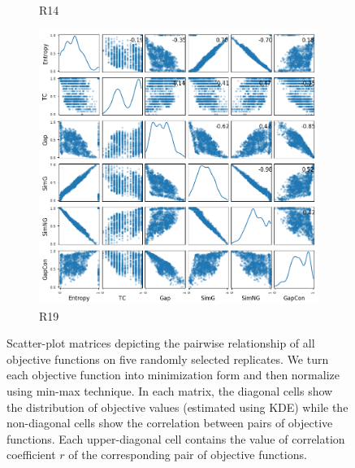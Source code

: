 \begin{figure}[!htbp]
\begin{adjustwidth}{-1cm}{-1cm}
\begin{subfigure}{0.35\textwidth}
			\caption{R14}
		\end{subfigure}
		\begin{subfigure}{0.35\textwidth}
			\includegraphics[width=\columnwidth]{Figure/6-obj-old/R19/fig/scatter_mattrix}
			\caption{R19}
		\end{subfigure}
		\caption{Scatter-plot matrices depicting the pairwise relationship of all objective functions on five randomly selected replicates. We turn each objective function into minimization form and then normalize using min-max technique. In each matrix, the diagonal cells show the distribution of objective values (estimated using KDE) while the non-diagonal cells show the correlation between pairs of objective functions. Each upper-diagonal cell contains the value of correlation coefficient $r$ of the corresponding pair of objective functions.}
		\label{fig:new_nature_obj}
	\end{adjustwidth}
\end{figure}
